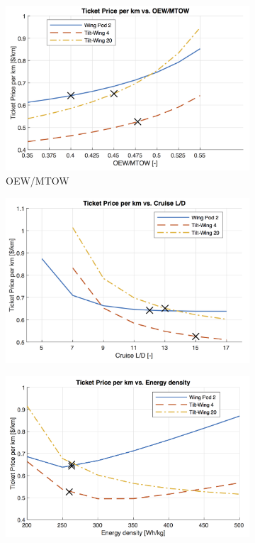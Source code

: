 \begin{figure}[H]
\begin{subfigure}[t]{0.33\textwidth}
    \centering
    \includegraphics[width=\textwidth]{Figures/OEWMTOW_TPrice_perkmNOPAD.png}
    \captionsetup{justification=centering}
    \caption{OEW/MTOW}
    \label{fig:sens4}
\end{subfigure}
\begin{subfigure}[t]{0.33\textwidth}
    \centering
    \includegraphics[width=\textwidth]{Figures/LoD_TPrice_perkmNOPAD.png}
    \captionsetup{justification=centering}
    \caption{}
    \label{fig:sens5}
\end{subfigure}
\begin{subfigure}[t]{0.33\textwidth}
    \centering
    \includegraphics[width=\textwidth]{Figures/Edens_TPrice_perkmNOPAD.png}

\end{subfigure}
\end{figure}
